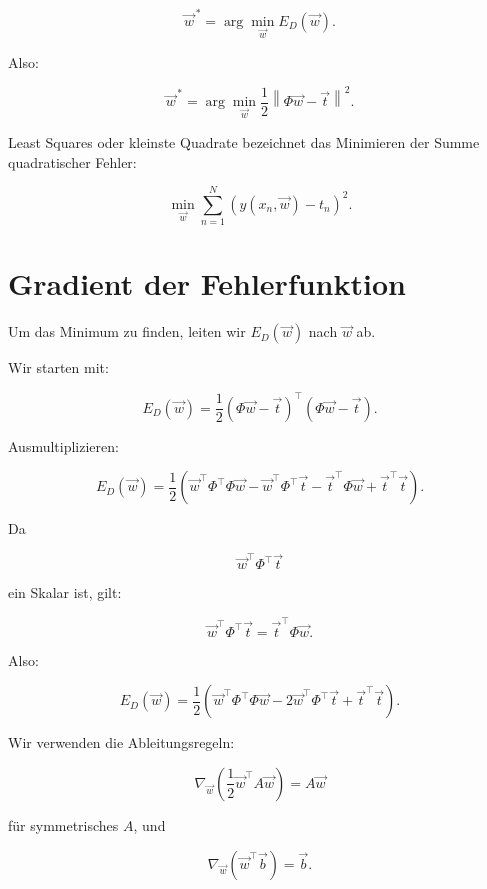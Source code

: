 \[
    \vec{w}^{\,*}
    =
    \arg\min_{\vec{w}}
    E_D(\vec{w}).
\]

Also:

\[
    \vec{w}^{\,*}
    =
    \arg\min_{\vec{w}}
    \frac{1}{2}
    \left\|
        \Phi\vec{w}-\vec{t}
    \right\|^2.
\]

\begin{definitionbox}
Least Squares oder kleinste Quadrate bezeichnet das Minimieren der Summe quadratischer Fehler:

\[
    \min_{\vec{w}}
    \sum_{n=1}^{N}
    \left(
        y(x_n,\vec{w})-t_n
    \right)^2.
\]
\end{definitionbox}

\section{Gradient der Fehlerfunktion}

Um das Minimum zu finden, leiten wir \(E_D(\vec{w})\) nach \(\vec{w}\) ab.

Wir starten mit:

\[
    E_D(\vec{w})
    =
    \frac{1}{2}
    (\Phi\vec{w}-\vec{t})^{\top}
    (\Phi\vec{w}-\vec{t}).
\]

Ausmultiplizieren:

\[
    E_D(\vec{w})
    =
    \frac{1}{2}
    \left(
        \vec{w}^{\top}\Phi^{\top}\Phi\vec{w}
        -
        \vec{w}^{\top}\Phi^{\top}\vec{t}
        -
        \vec{t}^{\top}\Phi\vec{w}
        +
        \vec{t}^{\top}\vec{t}
    \right).
\]

Da

\[
    \vec{w}^{\top}\Phi^{\top}\vec{t}
\]

ein Skalar ist, gilt:

\[
    \vec{w}^{\top}\Phi^{\top}\vec{t}
    =
    \vec{t}^{\top}\Phi\vec{w}.
\]

Also:

\[
    E_D(\vec{w})
    =
    \frac{1}{2}
    \left(
        \vec{w}^{\top}\Phi^{\top}\Phi\vec{w}
        -
        2\vec{w}^{\top}\Phi^{\top}\vec{t}
        +
        \vec{t}^{\top}\vec{t}
    \right).
\]

Wir verwenden die Ableitungsregeln:

\[
    \nabla_{\vec{w}}
    \left(
        \frac{1}{2}
        \vec{w}^{\top}A\vec{w}
    \right)
    =
    A\vec{w}
\]

für symmetrisches \(A\), und

\[
    \nabla_{\vec{w}}
    \left(
        \vec{w}^{\top}\vec{b}
    \right)
    =
    \vec{b}.
\]

